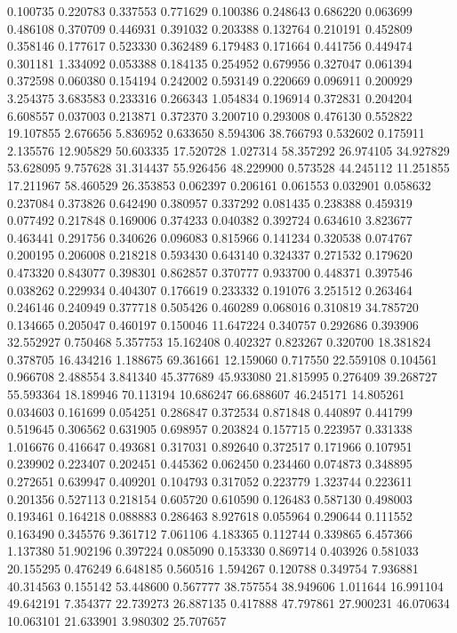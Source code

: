 0.100735
0.220783
0.337553
0.771629
0.100386
0.248643
0.686220
0.063699
0.486108
0.370709
0.446931
0.391032
0.203388
0.132764
0.210191
0.452809
0.358146
0.177617
0.523330
0.362489
6.179483
0.171664
0.441756
0.449474
0.301181
1.334092
0.053388
0.184135
0.254952
0.679956
0.327047
0.061394
0.372598
0.060380
0.154194
0.242002
0.593149
0.220669
0.096911
0.200929
3.254375
3.683583
0.233316
0.266343
1.054834
0.196914
0.372831
0.204204
6.608557
0.037003
0.213871
0.372370
3.200710
0.293008
0.476130
0.552822
19.107855
2.676656
5.836952
0.633650
8.594306
38.766793
0.532602
0.175911
2.135576
12.905829
50.603335
17.520728
1.027314
58.357292
26.974105
34.927829
53.628095
9.757628
31.314437
55.926456
48.229900
0.573528
44.245112
11.251855
17.211967
58.460529
26.353853
0.062397
0.206161
0.061553
0.032901
0.058632
0.237084
0.373826
0.642490
0.380957
0.337292
0.081435
0.238388
0.459319
0.077492
0.217848
0.169006
0.374233
0.040382
0.392724
0.634610
3.823677
0.463441
0.291756
0.340626
0.096083
0.815966
0.141234
0.320538
0.074767
0.200195
0.206008
0.218218
0.593430
0.643140
0.324337
0.271532
0.179620
0.473320
0.843077
0.398301
0.862857
0.370777
0.933700
0.448371
0.397546
0.038262
0.229934
0.404307
0.176619
0.233332
0.191076
3.251512
0.263464
0.246146
0.240949
0.377718
0.505426
0.460289
0.068016
0.310819
34.785720
0.134665
0.205047
0.460197
0.150046
11.647224
0.340757
0.292686
0.393906
32.552927
0.750468
5.357753
15.162408
0.402327
0.823267
0.320700
18.381824
0.378705
16.434216
1.188675
69.361661
12.159060
0.717550
22.559108
0.104561
0.966708
2.488554
3.841340
45.377689
45.933080
21.815995
0.276409
39.268727
55.593364
18.189946
70.113194
10.686247
66.688607
46.245171
14.805261
0.034603
0.161699
0.054251
0.286847
0.372534
0.871848
0.440897
0.441799
0.519645
0.306562
0.631905
0.698957
0.203824
0.157715
0.223957
0.331338
1.016676
0.416647
0.493681
0.317031
0.892640
0.372517
0.171966
0.107951
0.239902
0.223407
0.202451
0.445362
0.062450
0.234460
0.074873
0.348895
0.272651
0.639947
0.409201
0.104793
0.317052
0.223779
1.323744
0.223611
0.201356
0.527113
0.218154
0.605720
0.610590
0.126483
0.587130
0.498003
0.193461
0.164218
0.088883
0.286463
8.927618
0.055964
0.290644
0.111552
0.163490
0.345576
9.361712
7.061106
4.183365
0.112744
0.339865
6.457366
1.137380
51.902196
0.397224
0.085090
0.153330
0.869714
0.403926
0.581033
20.155295
0.476249
6.648185
0.560516
1.594267
0.120788
0.349754
7.936881
40.314563
0.155142
53.448600
0.567777
38.757554
38.949606
1.011644
16.991104
49.642191
7.354377
22.739273
26.887135
0.417888
47.797861
27.900231
46.070634
10.063101
21.633901
3.980302
25.707657
